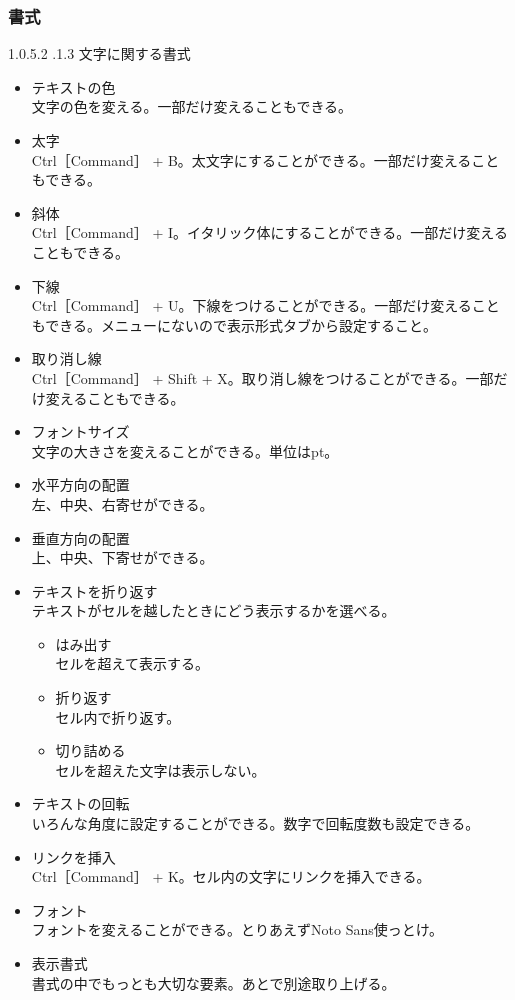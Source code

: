 \documentclass[dvipdfmx,jb5]{jarticle}
\makeatletter
\newcommand{\subsubsubsection}{\@startsection{paragraph}{4}{\z@}%
    {1.0\Cvs \@plus.5\Cdp \@minus.2\Cdp}%
    {.1\Cvs \@plus.3\Cdp}%
    {\large \bfseries}
  }
\makeatother
\begin{document}
 \subsubsection{書式}
 \subsubsubsection{文字に関する書式}
 \begin{itemize}
 \item テキストの色\\
 文字の色を変える。一部だけ変えることもできる。
 \item 太字\\
 Ctrl［Command］ + B。太文字にすることができる。一部だけ変えることもできる。
 \item 斜体\\
 Ctrl［Command］ + I。イタリック体にすることができる。一部だけ変えることもできる。
 \item 下線\\
 Ctrl［Command］ + U。下線をつけることができる。一部だけ変えることもできる。メニューにないので表示形式タブから設定すること。
 \item 取り消し線\\
 Ctrl［Command］ + Shift + X。取り消し線をつけることができる。一部だけ変えることもできる。
 \item フォントサイズ\\
 文字の大きさを変えることができる。単位はpt。
  \item 水平方向の配置\\
 左、中央、右寄せができる。
 \item 垂直方向の配置\\
 上、中央、下寄せができる。
 \item テキストを折り返す\\
 テキストがセルを越したときにどう表示するかを選べる。
 \begin{itemize}
 \item はみ出す\\
 セルを超えて表示する。
 \item 折り返す\\
 セル内で折り返す。
 \item 切り詰める\\
 セルを超えた文字は表示しない。
 \end{itemize}
 \item テキストの回転\\
 いろんな角度に設定することができる。数字で回転度数も設定できる。
 \item リンクを挿入\\
 Ctrl［Command］ + K。セル内の文字にリンクを挿入できる。
  \item フォント\\
  フォントを変えることができる。とりあえずNoto Sans使っとけ。
  \item 表示書式\\
  書式の中でもっとも大切な要素。あとで別途取り上げる。
 \end{itemize}
 
\end{document}
